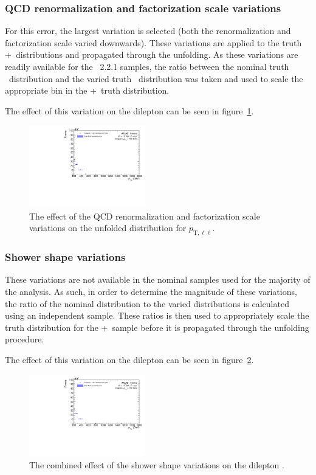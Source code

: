 \subsubsection{QCD renormalization and factorization scale variations}
For this error, the largest variation is selected (both the renormalization and factorization scale varied downwards). These variations are applied to the truth \powheg+\pythia~distributions and propagated through the unfolding. As these variations are readily available for the \sherpa~2.2.1 samples, the ratio between the nominal truth \sherpa~distribution and the varied truth \sherpa~distribution was taken and used to scale the appropriate bin in the \powheg+\pythia~truth distribution.

The effect of this variation on the dilepton \pt can be seen in figure~\ref{fig:qcdSystErr}.

\begin{figure}[h!]
  \centering
  \includegraphics[page=23,width=0.45\textwidth]{figures/unfoldErrPlots.pdf}
  \caption{The effect of the QCD renormalization and factorization scale variations on the unfolded distribution for $p_{\text{T},\ell\ell}$.}
  \label{fig:qcdSystErr}
\end{figure}

\subsubsection{Shower shape variations}
These variations are not available in the nominal samples used for the majority of the analysis. As such, in order to determine the magnitude of these variations, the ratio of the nominal distribution to the varied distributions is calculated using an independent sample. These ratios is then used to appropriately scale the truth distribution for the \powheg+\pythia~sample before it is propagated through the unfolding procedure.

The effect of this variation on the dilepton \pt can be seen in figure~\ref{fig:showerSystErr}.

\begin{figure}[h!]
  \centering
  \includegraphics[page=24,width=0.45\textwidth]{figures/unfoldErrPlots.pdf}
  \caption{The combined effect of the shower shape variations on the dilepton \pt.}
  \label{fig:showerSystErr}
\end{figure}

